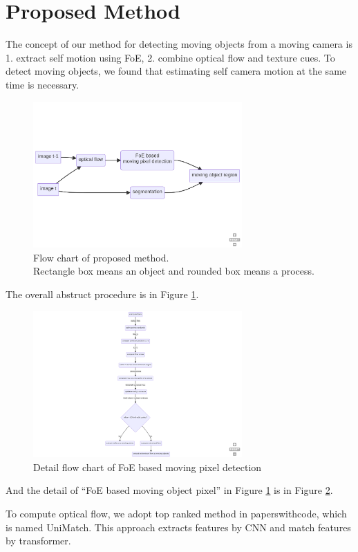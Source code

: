 \documentclass[10pt, twocolumn]{article}
\begin{document}
\section{Proposed Method}
The concept of our method for detecting moving objects from a moving camera is 1. extract self motion using FoE, 2. combine optical flow and texture cues.
To detect moving objects, we found that estimating self camera motion at the same time is necessary.
\begin{figure}[ht]
  \centering
  \includegraphics[width=8cm]{fig/wholeflow.png}
  \caption{Flow chart of proposed method.\\
    Rectangle box means an object and rounded box means a process.}
  \label{fig:wholeflow}
\end{figure}
The overall abstruct procedure is in Figure \ref{fig:wholeflow}.

\begin{figure}[ht]
  \centering
  \includegraphics[width=8cm]{fig/foeflow.png}
  \caption{Detail flow chart of FoE based moving pixel detection}
  \label{fig:foeflow}
\end{figure}
And the detail of ``FoE based moving object pixel'' in Figure \ref{fig:wholeflow} is in Figure \ref{fig:foeflow}.

To compute optical flow, we adopt top ranked method in paperswithcode, which is named UniMatch\cite{xu2022unifying}.
This approach extracts features by CNN and match features by transformer.
\end{document}
